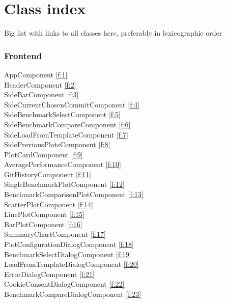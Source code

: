 \section{Class index}
Big list with links to all classes here, preferably in lexicographic order

\subsubsection{Frontend}

AppComponent \ref{f:1} \\
HeaderComponent \ref{f:2} \\
SideBarComponent \ref{f:3} \\
SideCurrentChosenCommitComponent \ref{f:4} \\
SideBenchmarkSelectComponent \ref{f:5} \\
SideBenchmarkCompareComponent \ref{f:6} \\
SideLoadFromTemplateComponent \ref{f:7} \\
SidePreviousPlotsComponent \ref{f:8} \\
PlotCardComponent \ref{f:9} \\
AveragePerformanceComponent \ref{f:10} \\
GitHistoryComponent \ref{f:11} \\
SingleBenchmarkPlotComponent \ref{f:12} \\
BenchmarkComparisonPlotComponent \ref{f:13} \\
ScatterPlotComponent \ref{f:14} \\
LinePlotComponent \ref{f:15} \\
BarPlotComponent \ref{f:16} \\
SummaryChartComponent \ref{f:17} \\
PlotConfigurationDialogComponent \ref{f:18} \\
BenchmarkSelectDialogComponent \ref{f:19} \\
LoadFromTemplateDialogComponent \ref{f:20} \\
ErrorDialogComponent \ref{f:21} \\
CookieConsentDialogComponent \ref{f:22} \\
BenchmarkCompareDialogComponent \ref{f:23} \\
